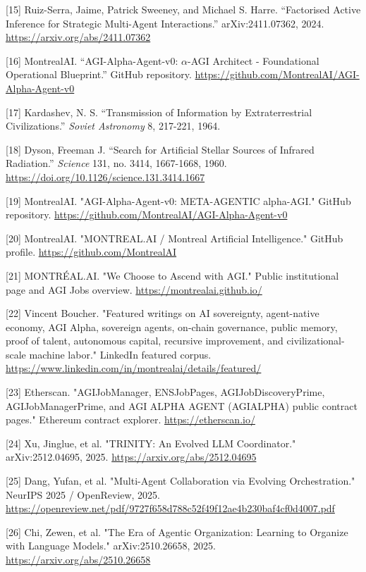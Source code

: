 \documentclass[
  11pt,
]{article}
\begin{document}
{[}15{]} Ruiz-Serra, Jaime, Patrick Sweeney, and Michael S. Harre.
``Factorised Active Inference for Strategic Multi-Agent Interactions.''
arXiv:2411.07362, 2024. \url{https://arxiv.org/abs/2411.07362}

{[}16{]} MontrealAI. ``AGI-Alpha-Agent-v0: $\alpha$-AGI Architect -
Foundational Operational Blueprint.'' GitHub repository.
\url{https://github.com/MontrealAI/AGI-Alpha-Agent-v0}


[17] Kardashev, N. S. ``Transmission of Information by Extraterrestrial
Civilizations.'' \emph{Soviet Astronomy} 8, 217-221, 1964.

[18] Dyson, Freeman J. ``Search for Artificial Stellar Sources of
Infrared Radiation.'' \emph{Science} 131, no. 3414, 1667-1668, 1960.
\url{https://doi.org/10.1126/science.131.3414.1667}


[19] MontrealAI. "AGI-Alpha-Agent-v0: META-AGENTIC alpha-AGI." GitHub repository. \url{https://github.com/MontrealAI/AGI-Alpha-Agent-v0}

[20] MontrealAI. "MONTREAL.AI / Montreal Artificial Intelligence." GitHub profile. \url{https://github.com/MontrealAI}

[21] MONTRÉAL.AI. "We Choose to Ascend with AGI." Public institutional page and AGI Jobs overview. \url{https://montrealai.github.io/}

[22] Vincent Boucher. "Featured writings on AI sovereignty, agent-native economy, AGI Alpha, sovereign agents, on-chain governance, public memory, proof of talent, autonomous capital, recursive improvement, and civilizational-scale machine labor." LinkedIn featured corpus. \url{https://www.linkedin.com/in/montrealai/details/featured/}

[23] Etherscan. "AGIJobManager, ENSJobPages, AGIJobDiscoveryPrime, AGIJobManagerPrime, and AGI ALPHA AGENT (AGIALPHA) public contract pages." Ethereum contract explorer. \url{https://etherscan.io/}



[24] Xu, Jinglue, et al. "TRINITY: An Evolved LLM Coordinator." arXiv:2512.04695, 2025. \url{https://arxiv.org/abs/2512.04695}

[25] Dang, Yufan, et al. "Multi-Agent Collaboration via Evolving Orchestration." NeurIPS 2025 / OpenReview, 2025. \url{https://openreview.net/pdf/9727f658d788c52f49f12ae4b230baf4cf0d4007.pdf}

[26] Chi, Zewen, et al. "The Era of Agentic Organization: Learning to Organize with Language Models." arXiv:2510.26658, 2025. \url{https://arxiv.org/abs/2510.26658}
\end{document}

